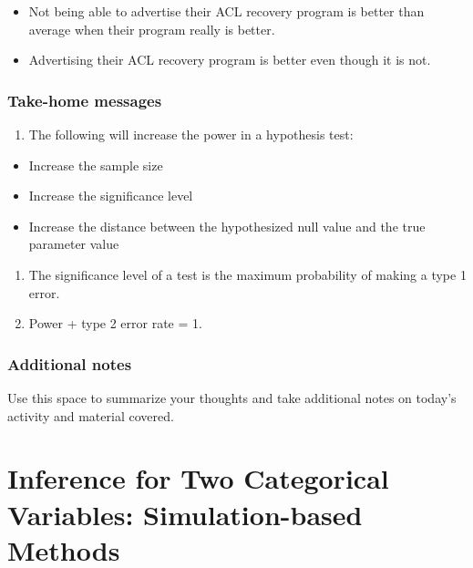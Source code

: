 \documentclass[
]{report}
\providecommand{\tightlist}{%
  \setlength{\itemsep}{0pt}\setlength{\parskip}{0pt}}
\begin{document}
\begin{itemize}
\item
  Not being able to advertise their ACL recovery program is better than average when their program really is better.
\item
  Advertising their ACL recovery program is better even though it is not.
\end{itemize}

\vspace{0.8in}

\hypertarget{take-home-messages-13}{%
\subsection{Take-home messages}\label{take-home-messages-13}}

\begin{enumerate}
\def\labelenumi{\arabic{enumi}.}
\tightlist
\item
  The following will increase the power in a hypothesis test:
\end{enumerate}

\begin{itemize}
\item
  Increase the sample size
\item
  Increase the significance level
\item
  Increase the distance between the hypothesized null value and the true parameter value
\end{itemize}

\begin{enumerate}
\def\labelenumi{\arabic{enumi}.}
\setcounter{enumi}{1}
\item
  The significance level of a test is the maximum probability of making a type 1 error.
\item
  Power + type 2 error rate = 1.
\end{enumerate}

\hypertarget{additional-notes-13}{%
\subsection{Additional notes}\label{additional-notes-13}}

Use this space to summarize your thoughts and take additional notes on today's activity and material covered.

\newpage

\hypertarget{inference-for-two-categorical-variables-simulation-based-methods}{%
\chapter{Inference for Two Categorical Variables: Simulation-based Methods}\label{inference-for-two-categorical-variables-simulation-based-methods}}
\end{document}
